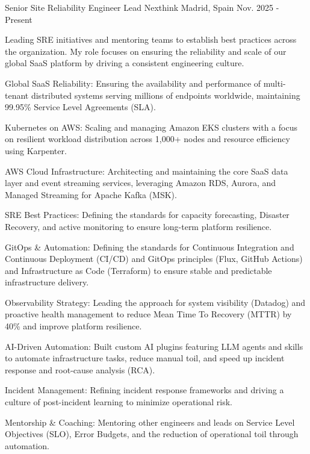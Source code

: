 

\begin{cventries}

  \cventry
    {Senior Site Reliability Engineer Lead} %
    {Nexthink} %
    {Madrid, Spain} %
    {Nov. 2025 - Present} %
    {
      \begin{cvitems} %
        \item {Leading SRE initiatives and mentoring teams to establish best practices across the organization. My role focuses on ensuring the reliability and scale of our global SaaS platform by driving a consistent engineering culture.}
        \item {Global SaaS Reliability: Ensuring the availability and performance of multi-tenant distributed systems serving millions of endpoints worldwide, maintaining 99.95\% Service Level Agreements (SLA).}
        \item {Kubernetes on AWS: Scaling and managing Amazon EKS clusters with a focus on resilient workload distribution across 1,000+ nodes and resource efficiency using Karpenter.}
        \item {AWS Cloud Infrastructure: Architecting and maintaining the core SaaS data layer and event streaming services, leveraging Amazon RDS, Aurora, and Managed Streaming for Apache Kafka (MSK).}
        \item {SRE Best Practices: Defining the standards for capacity forecasting, Disaster Recovery, and active monitoring to ensure long-term platform resilience.}
        \item {GitOps \& Automation: Defining the standards for Continuous Integration and Continuous Deployment (CI/CD) and GitOps principles (Flux, GitHub Actions) and Infrastructure as Code (Terraform) to ensure stable and predictable infrastructure delivery.}
        \item {Observability Strategy: Leading the approach for system visibility (Datadog) and proactive health management to reduce Mean Time To Recovery (MTTR) by 40\% and improve platform resilience.}
        \item {AI-Driven Automation: Built custom AI plugins featuring LLM agents and skills to automate infrastructure tasks, reduce manual toil, and speed up incident response and root-cause analysis (RCA).}
        \item {Incident Management: Refining incident response frameworks and driving a culture of post-incident learning to minimize operational risk.}
        \item {Mentorship \& Coaching: Mentoring other engineers and leads on Service Level Objectives (SLO), Error Budgets, and the reduction of operational toil through automation.}
      \end{cvitems}
    }


\end{cventries}
